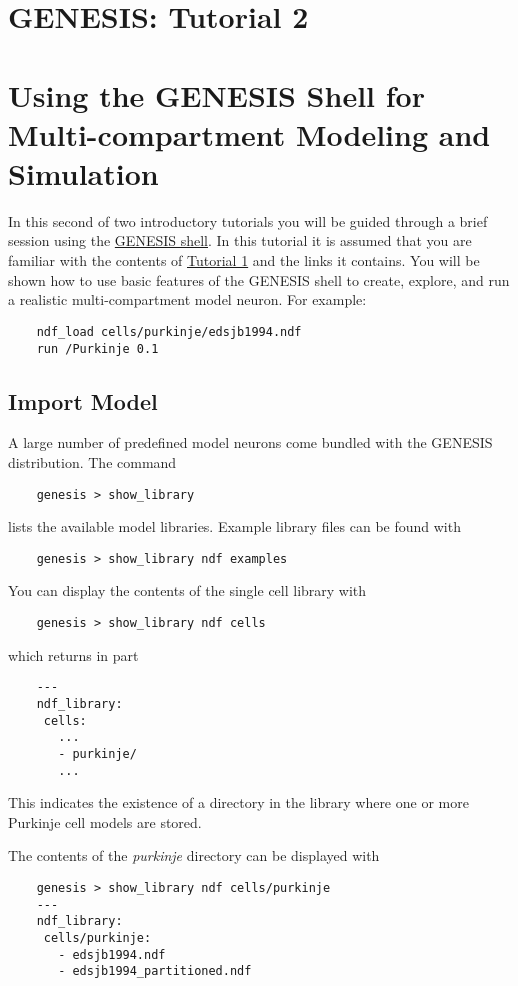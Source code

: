\documentclass[12pt]{article}
\begin{document}
\section*{GENESIS: Tutorial 2}

\section*{Using the GENESIS Shell for\\Multi-compartment Modeling and Simulation}

In this second of two introductory tutorials you will be guided through a brief session using the \href{../gshell/gshell.tex}{GENESIS shell}. In this tutorial it is assumed that you are familiar with the contents of \href{../tutorial1/tutorial1.tex}{Tutorial 1} and the links it contains. You will be shown how to use basic features of the GENESIS shell to create, explore, and run a realistic multi-compartment model neuron. For example:
\begin{verbatim}
    ndf_load cells/purkinje/edsjb1994.ndf
    run /Purkinje 0.1
\end{verbatim}

\subsection*{Import Model}

A large number of predefined model neurons come bundled with the GENESIS distribution. The command
\begin{verbatim}
    genesis > show_library
\end{verbatim}
lists the available model libraries. Example library files can be found with
\begin{verbatim}
    genesis > show_library ndf examples
\end{verbatim}
You can display the contents of the single cell library with
\begin{verbatim}
    genesis > show_library ndf cells
\end{verbatim}
which returns in part
\begin{verbatim}
    ---
    ndf_library:
     cells:
       ...
       - purkinje/
       ...
\end{verbatim}
This indicates the existence of a directory in the library where one or more Purkinje cell models are stored.

The contents of the {\it purkinje} directory can be displayed with
\begin{verbatim}
    genesis > show_library ndf cells/purkinje
    ---
    ndf_library:
     cells/purkinje:
       - edsjb1994.ndf
       - edsjb1994_partitioned.ndf
\end{verbatim}
\end{document}
